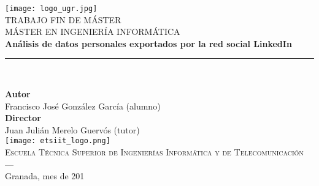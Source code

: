 \begin{titlepage}
 
 
\newlength{\centeroffset}
\setlength{\centeroffset}{-0.5\oddsidemargin}
\addtolength{\centeroffset}{0.5\evensidemargin}
\thispagestyle{empty}

\noindent\hspace*{\centeroffset}\begin{minipage}{\textwidth}

\centering
\texttt{[image: logo\_ugr.jpg]}\\[1.4cm]

\textsc{ \Large TRABAJO FIN DE MÁSTER\\[0.2cm]}
\textsc{ MÁSTER EN INGENIERÍA INFORMÁTICA }\\[1cm]
% 
{\Huge\bfseries Análisis de datos personales exportados por la red social LinkedIn\\
}
\noindent\rule[-1ex]{\textwidth}{3pt}\\[3.5ex]
\end{minipage}

\vspace{1.5cm}
\noindent\hspace*{\centeroffset}\begin{minipage}{\textwidth}
\centering

\textbf{Autor}\\ {Francisco José González García (alumno)}\\[2.5ex]
\textbf{Director}\\
{Juan Julián Merelo Guervós (tutor)}\\[2cm]
\texttt{[image: etsiit\_logo.png]}\\[0.1cm]
\textsc{Escuela Técnica Superior de Ingenierías Informática y de Telecomunicación}\\
\textsc{---}\\
Granada, mes de 201
\end{minipage}
\end{titlepage}


